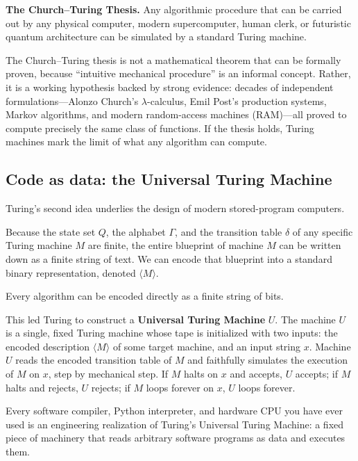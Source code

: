 \begin{focusbox}
\textbf{The Church--Turing Thesis.} Any algorithmic procedure that can be carried out by any physical computer, modern supercomputer, human clerk, or futuristic quantum architecture can be simulated by a standard Turing machine.

The Church--Turing thesis is not a mathematical theorem that can be formally proven, because ``intuitive mechanical procedure'' is an informal concept. Rather, it is a working hypothesis backed by strong evidence: decades of independent formulations---Alonzo Church's $\lambda$-calculus, Emil Post's production systems, Markov algorithms, and modern random-access machines (RAM)---all proved to compute precisely the same class of functions. If the thesis holds, Turing machines mark the limit of what any algorithm can compute.
\end{focusbox}

\subsection{Code as data: the Universal Turing Machine}

Turing's second idea underlies the design of modern stored-program computers.

Because the state set $Q$, the alphabet $\Gamma$, and the transition table $\delta$ of any specific Turing machine $M$ are finite, the entire blueprint of machine $M$ can be written down as a finite string of text. We can encode that blueprint into a standard binary representation, denoted $\langle M \rangle$.

Every algorithm can be encoded directly as a finite string of bits.

This led Turing to construct a \textbf{Universal Turing Machine} $U$. The machine $U$ is a single, fixed Turing machine whose tape is initialized with two inputs: the encoded description $\langle M \rangle$ of some target machine, and an input string $x$. Machine $U$ reads the encoded transition table of $M$ and faithfully simulates the execution of $M$ on $x$, step by mechanical step. If $M$ halts on $x$ and accepts, $U$ accepts; if $M$ halts and rejects, $U$ rejects; if $M$ loops forever on $x$, $U$ loops forever.

Every software compiler, Python interpreter, and hardware CPU you have ever used is an engineering realization of Turing's Universal Turing Machine: a fixed piece of machinery that reads arbitrary software programs as data and executes them.

